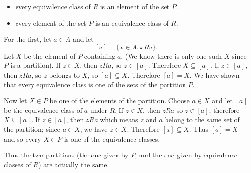 \documentclass[
]{article}
\providecommand{\tightlist}{%
  \setlength{\itemsep}{0pt}\setlength{\parskip}{0pt}}
\begin{document}
\begin{itemize}
\tightlist
\item
  every equivalence class of \(R\) is an element of the set \(P\).
\item
  every element of the set \(P\) is an equivalence class of \(R\).
\end{itemize}

For the first, let \(a\in A\) and let \[
[a]=\{x\in A: xRa\}.
\] Let \(X\) be the element of \(P\) containing \(a\). (We know there is
only one such \(X\) since \(P\) is a partition). If \(z\in X\), then
\(zRa\), so \(z\in [a]\). Therefore \(X\subseteq[a]\). If \(z\in [a]\),
then \(zRa\), so \(z\) belongs to \(X\), so \([a]\subseteq X\).
Therefore \([a]=X\). We have shown that every equivalence class is one
of the sets of the partition \(P\).

Now let \(X\in P\) be one of the elements of the partition. Choose
\(a\in X\) and let \([a]\) be the equivalence class of \(a\) under
\(R\). If \(z\in X\), then \(zRa\) so \(z\in [a]\); therefore
\(X\subseteq[a]\). If \(z\in [a]\), then \(zRa\) which means \(z\) and
\(a\) belong to the same set of the partition; since \(a\in X\), we have
\(z\in X\). Therefore \([a]\subseteq X\). Thus \([a]=X\) and so every
\(X\in P\) is one of the equivalence classes.

Thus the two partitions (the one given by \(P\), and the one given by
equivalence classes of \(R\)) are actually the same.
\end{document}
